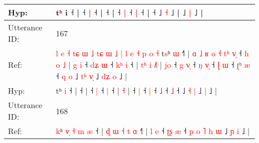 \documentclass[10pt]{article}
\DeclareRobustCommand{\hl}[1]{{\textcolor{red}{#1}}}
\begin{document}
\begin{longtable}{ll}
 \\
Hyp: & \hl{}\hl{}\hl{}\hl{}\hl{}\hl{}\hl{}\hl{}\hl{}\hl{}\hl{}\hl{}\hl{}\hl{}\hl{}\hl{}\hl{}\hl{}\hl{}\hl{}\hl{}t\hl{}\hl{}\hl{}\hl{}\hl{}\hl{}\hl{}\hl{}\hl{}\hl{}\hl{}\hl{}\hl{}\hl{}\hl{}\hl{}\hl{}\hl{}\hl{}\hl{}\hl{}\hl{}\hl{ʰ} i ˧\hl{}\hl{}\hl{}\hl{}\hl{}\hl{}\hl{}\hl{}\hl{}\hl{} |\hl{}\hl{} ˧\hl{}\hl{} \hl{|} ˧\hl{}\hl{}\hl{}\hl{}\hl{}\hl{}\hl{}\hl{}\hl{}\hl{}\hl{}\hl{}\hl{}\hl{}\hl{}\hl{}\hl{}\hl{}\hl{} |\hl{}\hl{}\hl{}\hl{}\hl{} ˧\hl{}\hl{}\hl{}\hl{}\hl{}\hl{}\hl{}\hl{}\hl{}\hl{}\hl{}\hl{}\hl{} |\hl{}\hl{}\hl{}\hl{}\hl{}\hl{} ˧\hl{}\hl{} \hl{|} ˧\hl{}\hl{} \hl{|} ˧ |\hl{}\hl{}\hl{}\hl{}\hl{}\hl{} ˧\hl{}\hl{}\hl{}\hl{}\hl{}\hl{}\hl{}\hl{}\hl{}\hl{} ˩\hl{}\hl{} \hl{˧} ˩ |\hl{}\hl{} ˩\hl{}\hl{} \hl{|} ˩ |
 \\
\midrule
Utterance ID: & 167 \\
Ref: & \hl{l}\hl{ }\hl{e}\hl{ }\hl{˧}\hl{ }\hl{t}\hl{ɕ}\hl{ }\hl{ɯ}\hl{ }\hl{˩}\hl{ }\hl{t}\hl{ɕ}\hl{ }\hl{ɯ}\hl{ }\hl{˩}\hl{ }\hl{|}\hl{ }\hl{l}\hl{ }\hl{e}\hl{ }\hl{˧}\hl{ }\hl{p}\hl{ }\hl{o}\hl{ }\hl{˧}\hl{ }t\hl{s}ʰ \hl{ɯ} ˧\hl{˥} |\hl{ }\hl{ɑ}\hl{ }\hl{˩}\hl{ }\hl{ʁ}\hl{ }\hl{o}\hl{ }\hl{˧}\hl{ }\hl{t}\hl{ʰ}\hl{ }\hl{v}\hl{̩} ˧\hl{ }\hl{h}\hl{ }\hl{o}\hl{ }\hl{˩} |\hl{ }\hl{g}\hl{ }\hl{i} ˧\hl{ }\hl{d}\hl{ʑ} \hl{ɯ} ˧\hl{ }\hl{k}\hl{ʰ} \hl{i} ˧ |\hl{ }\hl{t}\hl{ʰ}\hl{ }\hl{i} \hl{˩}\hl{˥} |\hl{ }\hl{j}\hl{o} ˧\hl{ }\hl{g} \hl{v}\hl{̩} ˧\hl{ }\hl{ŋ} \hl{v}\hl{̩} ˧\hl{ }\hl{ɭ} \hl{ɯ} ˧\hl{ }\hl{ʈ}\hl{ʰ} \hl{æ} ˧\hl{ }\hl{q}\hl{ }\hl{o} ˩ \hl{t}\hl{ʰ} \hl{v}\hl{̩} ˩\hl{ }\hl{d}\hl{ʑ} \hl{o} ˩ |
 \\
Hyp: & \hl{}\hl{}\hl{}\hl{}\hl{}\hl{}\hl{}\hl{}\hl{}\hl{}\hl{}\hl{}\hl{}\hl{}\hl{}\hl{}\hl{}\hl{}\hl{}\hl{}\hl{}\hl{}\hl{}\hl{}\hl{}\hl{}\hl{}\hl{}\hl{}\hl{}\hl{}\hl{}\hl{}\hl{}t\hl{}ʰ \hl{i} ˧\hl{} |\hl{}\hl{}\hl{}\hl{}\hl{}\hl{}\hl{}\hl{}\hl{}\hl{}\hl{}\hl{}\hl{}\hl{}\hl{}\hl{} ˧\hl{}\hl{}\hl{}\hl{}\hl{}\hl{} |\hl{}\hl{}\hl{}\hl{} ˧\hl{}\hl{}\hl{} \hl{|} ˧\hl{}\hl{}\hl{} \hl{|} ˧ |\hl{}\hl{}\hl{}\hl{}\hl{} \hl{}\hl{˧} |\hl{}\hl{}\hl{} ˧\hl{}\hl{} \hl{}\hl{|} ˧\hl{}\hl{} \hl{}\hl{|} ˧\hl{}\hl{} \hl{˩} ˧\hl{}\hl{}\hl{} \hl{˩} ˧\hl{}\hl{}\hl{}\hl{} ˩ \hl{}\hl{˧} \hl{}\hl{|} ˩\hl{}\hl{}\hl{} \hl{|} ˩ |
 \\
\midrule
Utterance ID: & 168 \\
Ref: & \hl{k}ʰ\hl{ }\hl{v}\hl{̩}\hl{ }\hl{˧}\hl{ }\hl{m}\hl{ }\hl{æ} ˧ |\hl{ }\hl{ɖ}\hl{ }\hl{ɯ}\hl{ }\hl{˧}\hl{ }\hl{t}\hl{ }\hl{ɑ} ˧\hl{˥} |\hl{ }\hl{l}\hl{ }\hl{e} ˧\hl{ }\hl{ʈ}\hl{ʂ} \hl{æ} ˧\hl{ }\hl{p}\hl{ }\hl{o}\hl{ }\hl{˥}\hl{ }\hl{h} \hl{ɯ} ˩\hl{ }\hl{ɲ} \hl{i} ˩ |

\end{longtable}
\end{document}
